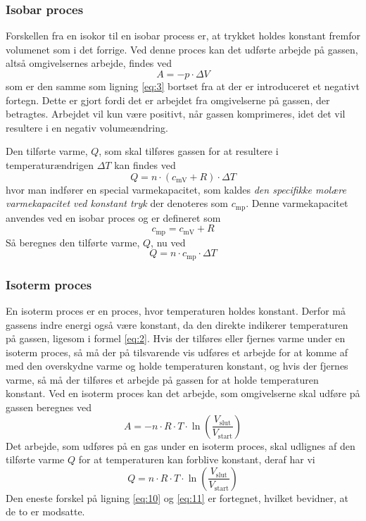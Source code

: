 \documentclass[SRC.tex]{subfiles}
\begin{document}
	\subsubsection{Isobar proces}
	Forskellen fra en isokor til en isobar process er, at trykket 
	holdes konstant fremfor volumenet som i det forrige. Ved
	denne proces kan det udførte arbejde på gassen, altså 
	omgivelsernes arbejde, findes ved
	\begin{equation}
	A = -p \cdot \Delta V
	\end{equation}
	som er den samme som ligning \eqref{eq:3} bortset fra at
	der er introduceret et negativt fortegn. Dette er gjort fordi det er arbejdet fra omgivelserne 
	på gassen, der betragtes. Arbejdet vil kun være positivt, når gassen komprimeres, idet det 
	vil resultere i en negativ volumeændring.  
	
	Den tilførte varme, \(Q\), som skal tilføres gassen for at 
	resultere i temperaturændrigen \(\Delta T\) kan findes ved
	\begin{equation}
	Q = n \cdot (c_{\text{mV}} + R) \cdot \Delta T
	\end{equation} 
	hvor man indfører en special varmekapacitet, som kaldes \textit{den specifikke molære varmekapacitet ved konstant tryk} der denoteres som \(c_{\text{mp}}\). Denne varmekapacitet anvendes ved en isobar proces og er defineret som
	\begin{equation}
	c_{\text{mp}} = c_{\text{mV}} + R
	\end{equation}
	Så beregnes den tilførte varme, \(Q\), nu ved
	\begin{equation}
	Q = n \cdot c_{\text{mp}} \cdot \Delta T
	\end{equation}
	\subsubsection{Isoterm proces}
	En isoterm proces er en proces, hvor temperaturen holdes konstant. 
	Derfor må gassens indre energi også være konstant, da den direkte 
	indikerer temperaturen på gassen, ligesom i formel \eqref{eq:2}.
	Hvis der tilføres eller fjernes varme under en 
	isoterm proces, så må der på tilsvarende vis udføres et arbejde for
	at komme af med den overskydne varme og holde temperaturen konstant,
	og hvis der fjernes varme, så må der tilføres et arbejde på gassen
	for at holde temperaturen konstant. Ved en isoterm proces kan det 
	arbejde, som omgivelserne skal udføre på gassen beregnes ved
	\begin{equation}
	A = -n \cdot R \cdot T \cdot \ln\left(\frac{V_{\text{slut}}}{V_{\text{start}}}\right)
	\label{eq:10}
	\end{equation}
	Det arbejde, som udføres på en gas under en isoterm proces, skal 
	udlignes af den tilførte varme \(Q\) for at temperaturen kan forblive
	konstant, deraf har vi
	\begin{equation}
	Q = n \cdot R \cdot T \cdot \ln\left(\frac{V_{\text{slut}}}{V_{\text{start}}}\right)
	\label{eq:11}
	\end{equation}
	Den eneste forskel på ligning \eqref{eq:10} og \eqref{eq:11} er fortegnet,
	hvilket bevidner, at de to er modsatte.
	
\end{document}
